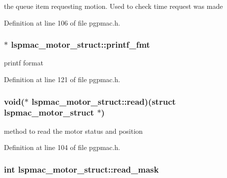 the queue item requesting motion. Used to check time request was made 



Definition at line 106 of file pgpmac.\-h.

\hypertarget{structlspmac__motor__struct_a25b13b65baf1b28c34012850809b0a3a}{
\subsubsection[{printf\-\_\-fmt}]{$\ast$ lspmac\-\_\-motor\-\_\-struct\-::printf\-\_\-fmt}}\label{structlspmac__motor__struct_a25b13b65baf1b28c34012850809b0a3a}


printf format 



Definition at line 121 of file pgpmac.\-h.

\hypertarget{structlspmac__motor__struct_ac62692eb939c04ca35e939d1c3acfe8f}{
\subsubsection[{read}]{\setlength{\rightskip}{0pt plus 5cm}void($\ast$ lspmac\-\_\-motor\-\_\-struct\-::read)(struct {\bf lspmac\-\_\-motor\-\_\-struct} $\ast$)}}\label{structlspmac__motor__struct_ac62692eb939c04ca35e939d1c3acfe8f}


method to read the motor status and position 



Definition at line 104 of file pgpmac.\-h.

\hypertarget{structlspmac__motor__struct_a3c24ed30c5a3ad490c6139b2780b2af7}{
\subsubsection[{read\-\_\-mask}]{\setlength{\rightskip}{0pt plus 5cm}int lspmac\-\_\-motor\-\_\-struct\-::read\-\_\-mask}}\label{structlspmac__motor__struct_a3c24ed30c5a3ad490c6139b2780b2af7}


